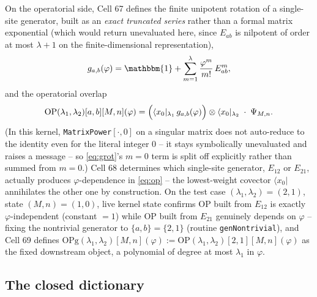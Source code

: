 \documentclass[11pt]{article}
\begin{document}
On the operatorial side, Cell 67 defines the finite unipotent rotation of a single-site generator,
built as an \emph{exact truncated series} rather than a formal matrix exponential (which would
return unevaluated here, since $E_{ab}$ is nilpotent of order at most $\lambda+1$ on the
finite-dimensional representation),
\begin{equation}
  g_{a,b}(\varphi) = \mathbbm{1} + \sum_{m=1}^{\lambda}\frac{\varphi^m}{m!}\,E_{ab}^m,
  \label{eq:grot}
\end{equation}
and the operatorial overlap
\begin{equation}
  \mathrm{OP}(\lambda_1,\lambda_2)[a,b][M,n](\varphi) = \Bigl(\langle x_0|_{\lambda_1}\,g_{a,b}(\varphi)\Bigr)\otimes\langle x_0|_{\lambda_2}
  \;\cdot\;\Psi_{M,n}.
  \label{eq:op}
\end{equation}
(In this kernel, \texttt{MatrixPower}$[\cdot,0]$ on a singular matrix does not auto-reduce to the
identity even for the literal integer $0$ -- it stays symbolically unevaluated and raises a
message -- so \eqref{eq:grot}'s $m=0$ term is split off explicitly rather than summed from $m=0$.)
Cell 68 determines which single-site generator, $E_{12}$ or $E_{21}$, actually produces
$\varphi$-dependence in \eqref{eq:op} -- the lowest-weight covector $\langle x_0|$ annihilates the
other one by construction. On the test case $(\lambda_1,\lambda_2)=(2,1)$, state $(M,n)=(1,0)$,
live kernel state confirms $\mathrm{OP}$ built from $E_{12}$ is exactly $\varphi$-independent
(constant $=1$) while $\mathrm{OP}$ built from $E_{21}$ genuinely depends on $\varphi$ -- fixing the
nontrivial generator to $\{a,b\}=\{2,1\}$ (routine \texttt{genNontrivial}), and Cell 69 defines
$\mathrm{OPg}(\lambda_1,\lambda_2)[M,n](\varphi) := \mathrm{OP}(\lambda_1,\lambda_2)[2,1][M,n](\varphi)$
as the fixed downstream object, a polynomial of degree at most $\lambda_1$ in $\varphi$.

\subsection{The closed dictionary}
\end{document}
